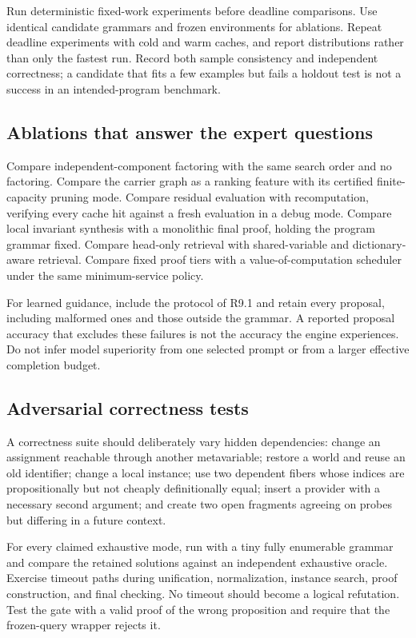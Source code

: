 \documentclass[11pt,a4paper]{article}
\theoremstyle{remark}
\begin{document}
Run deterministic fixed-work experiments before deadline comparisons. Use identical candidate grammars and frozen environments for ablations. Repeat deadline experiments with cold and warm caches, and report distributions rather than only the fastest run. Record both sample consistency and independent correctness; a candidate that fits a few examples but fails a holdout test is not a success in an intended-program benchmark.

\subsection{Ablations that answer the expert questions}

Compare independent-component factoring with the same search order and no factoring. Compare the carrier graph as a ranking feature with its certified finite-capacity pruning mode. Compare residual evaluation with recomputation, verifying every cache hit against a fresh evaluation in a debug mode. Compare local invariant synthesis with a monolithic final proof, holding the program grammar fixed. Compare head-only retrieval with shared-variable and dictionary-aware retrieval. Compare fixed proof tiers with a value-of-computation scheduler under the same minimum-service policy.

For learned guidance, include the protocol of R9.1 and retain every proposal, including malformed ones and those outside the grammar. A reported proposal accuracy that excludes these failures is not the accuracy the engine experiences. Do not infer model superiority from one selected prompt or from a larger effective completion budget.

\subsection{Adversarial correctness tests}

A correctness suite should deliberately vary hidden dependencies: change an assignment reachable through another metavariable; restore a world and reuse an old identifier; change a local instance; use two dependent fibers whose indices are propositionally but not cheaply definitionally equal; insert a provider with a necessary second argument; and create two open fragments agreeing on probes but differing in a future context.

For every claimed exhaustive mode, run with a tiny fully enumerable grammar and compare the retained solutions against an independent exhaustive oracle. Exercise timeout paths during unification, normalization, instance search, proof construction, and final checking. No timeout should become a logical refutation. Test the gate with a valid proof of the wrong proposition and require that the frozen-query wrapper rejects it.
\end{document}
